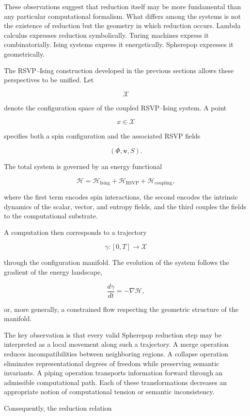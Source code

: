 \documentclass[12pt,letterpaper]{article}
\theoremstyle{remark}
\begin{document}
These observations suggest that reduction itself may be more fundamental than any particular computational formalism. What differs among the systems is not the existence of reduction but the geometry in which reduction occurs. Lambda calculus expresses reduction symbolically. Turing machines express it combinatorially. Ising systems express it energetically. Spherepop expresses it geometrically.

The RSVP--Ising construction developed in the previous sections allows these perspectives to be unified. Let

\[
\mathcal{X}
\]

denote the configuration space of the coupled RSVP--Ising system. A point

\[
x \in \mathcal{X}
\]

specifies both a spin configuration and the associated RSVP fields

\[
(\Phi,\mathbf{v},S).
\]

The total system is governed by an energy functional

\[
\mathcal{H} =
\mathcal{H}_{\mathrm{Ising}}
+
\mathcal{H}_{\mathrm{RSVP}}
+
\mathcal{H}_{\mathrm{coupling}},
\]

where the first term encodes spin interactions, the second encodes the intrinsic dynamics of the scalar, vector, and entropy fields, and the third couples the fields to the computational substrate.

A computation then corresponds to a trajectory

\[
\gamma : [0,T] \to \mathcal{X}
\]

through the configuration manifold. The evolution of the system follows the gradient of the energy landscape,

\[
\frac{d\gamma}{dt} = -\nabla \mathcal{H},
\]

or, more generally, a constrained flow respecting the geometric structure of the manifold.

The key observation is that every valid Spherepop reduction step may be interpreted as a local movement along such a trajectory. A merge operation reduces incompatibilities between neighboring regions. A collapse operation eliminates representational degrees of freedom while preserving semantic invariants. A piping operation transports information forward through an admissible computational path. Each of these transformations decreases an appropriate notion of computational tension or semantic inconsistency.

Consequently, the reduction relation
\end{document}
